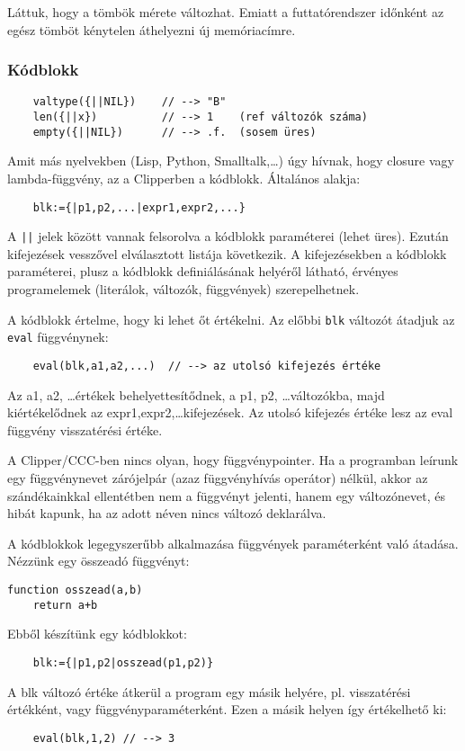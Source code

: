 Láttuk, hogy a tömbök mérete változhat. 
Emiatt a futtatórendszer időnként az egész tömböt 
kénytelen áthelyezni új memóriacímre.

\subsubsection{Kódblokk}

\begin{verbatim}
    valtype({||NIL})    // --> "B"
    len({||x})          // --> 1    (ref változók száma)
    empty({||NIL})      // --> .f.  (sosem üres)
\end{verbatim}

Amit más nyelvekben (Lisp, Python, Smalltalk,\ldots) úgy hívnak, hogy closure vagy
lambda-függvény, az a Clipperben a kódblokk. Általános alakja: 
\begin{verbatim}
    blk:={|p1,p2,...|expr1,expr2,...}
\end{verbatim}
A \verb!||! jelek között vannak felsorolva a kódblokk paraméterei (lehet üres).
Ezután kifejezések vesszővel elválasztott listája következik. A kifejezésekben 
a kódblokk paraméterei, plusz a kódblokk definiálásának helyéről látható, érvényes
programelemek (literálok, változók, függvények) szerepelhetnek. 

A kódblokk értelme, hogy ki lehet őt értékelni. Az előbbi \verb!blk!
változót átadjuk az \verb!eval! függvénynek:
\begin{verbatim}
    eval(blk,a1,a2,...)  // --> az utolsó kifejezés értéke
\end{verbatim}
Az a1, a2, \ldots értékek behelyettesítődnek, a p1, p2, \ldots változókba,
majd kiértékelődnek az expr1,expr2,\ldots kifejezések. Az utolsó kifejezés
értéke lesz az eval függvény visszatérési értéke.

A Clipper/CCC-ben nincs olyan, hogy függvénypointer. Ha a programban leírunk 
egy függvénynevet  zárójelpár (azaz függvényhívás operátor) nélkül, 
akkor az szándékainkkal ellentétben nem a függvényt jelenti, hanem egy változónevet, 
és hibát kapunk, ha az adott néven nincs változó deklarálva. 

A kódblokkok legegyszerűbb alkalmazása függvények paraméterként való átadása.
Nézzünk egy összeadó függvényt:
\begin{verbatim}
function osszead(a,b)
    return a+b
\end{verbatim}
Ebből készítünk egy kódblokkot:
\begin{verbatim}
    blk:={|p1,p2|osszead(p1,p2)}
\end{verbatim}
A blk változó értéke átkerül a program egy másik helyére, 
pl. visszatérési értékként, vagy függvény\-paraméterként. 
Ezen a másik helyen így értékelhető ki:
\begin{verbatim}
    eval(blk,1,2) // --> 3
\end{verbatim}


